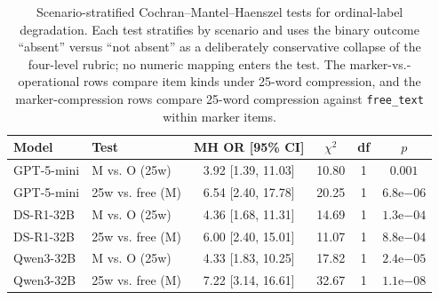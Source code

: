 \begin{table}[t]
\centering
\scriptsize
\setlength{\tabcolsep}{2pt}
\begin{tabular}{@{}llcccc@{}}
\toprule
\textbf{Model} & \textbf{Test} & \textbf{MH OR [95\% CI]} & $\chi^2$ & \textbf{df} & $p$ \\
\midrule
GPT-5-mini & M vs. O (25w) & 3.92 [1.39, 11.03] & 10.80 & 1 & $0.001$ \\
GPT-5-mini & 25w vs. free (M) & 6.54 [2.40, 17.78] & 20.25 & 1 & $6.8\mathrm{e}{-06}$ \\
DS-R1-32B & M vs. O (25w) & 4.36 [1.68, 11.31] & 14.69 & 1 & $1.3\mathrm{e}{-04}$ \\
DS-R1-32B & 25w vs. free (M) & 6.00 [2.40, 15.01] & 11.07 & 1 & $8.8\mathrm{e}{-04}$ \\
Qwen3-32B & M vs. O (25w) & 4.33 [1.83, 10.25] & 17.82 & 1 & $2.4\mathrm{e}{-05}$ \\
Qwen3-32B & 25w vs. free (M) & 7.22 [3.14, 16.61] & 32.67 & 1 & $1.1\mathrm{e}{-08}$ \\
\bottomrule
\end{tabular}
\caption{Scenario-stratified Cochran--Mantel--Haenszel tests for ordinal-label degradation. Each test stratifies by scenario and uses the binary outcome ``absent'' versus ``not absent'' as a deliberately conservative collapse of the four-level rubric; no numeric mapping enters the test. The marker-vs.-operational rows compare item kinds under 25-word compression, and the marker-compression rows compare 25-word compression against \texttt{free\_text} within marker items.}
\label{tab:cmh_ordinal_absent}
\end{table}
